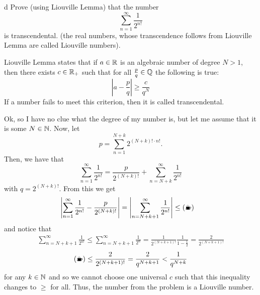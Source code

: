 \documentclass{article}
\begin{document}
\begin{problem}[7]{d}
Prove (using Liouville Lemma) that the number
$$\sum\limits_{n=1}^\infty \frac{1}{2^{n!}}$$
is transcendental. (the real numbers, whose transcendence follows from Liouville Lemma are called Liouville numbers).
\end{problem}

Liouville Lemma states that if $a\in\mathbb{R}$ is an algebraic number of degree $N>1$, then there exists $c\in\mathbb{R}_+$ such that for all $\frac{p}{q}\in\mathbb{Q}$ the following is true:
$$\left|a-\frac{p}{q}\right|\geq\frac{c}{q^N}$$
If a number fails to meet this criterion, then it is called transcendental.

Ok, so I have no clue what the degree of my number is, but let me assume that it is some $N\in\mathbb{N}$. Now, let
$$p=\sum\limits_{n=1}^{N+k}2^{(N+k)!\cdot n!}.$$
Then, we have that
$$\sum\limits_{n=1}^\infty\frac{1}{2^{n!}}=\frac{p}{2^{(N+k)!}}+\sum\limits_{n=N+k}^\infty \frac{1}{2^{n!}}$$
with $q=2^{(N+k)!}$. From this we get
\begin{align*}
    \left|\sum\limits_{n=1}^\infty\frac{1}{2^{n!}}-\frac{p}{2^{(N+k)!}}\right|&=\left|\sum\limits_{n=N+k+1}^\infty\frac{1}{2^{n!}}\right|\leq\text{(\Coffeecup)}
\end{align*}
and notice that
\begin{align*}
    \sum\limits_{n=N+k+1}^\infty\frac{1}{2^{n!}}\leq \sum\limits_{n=N+k+1}^\infty\frac{1}{2^n}=\frac{1}{2^{(N+k+1)!}}\frac{1}{1-\frac12}=\frac{2}{2^{(N+k+1)!}}
\end{align*}
\begin{align*}
    \text{(\Coffeecup)}\leq\frac{2}{2^{(N+k+1)!}}=\frac{2}{q^{N+k+1}}<\frac{1}{q^{N+k}}  
\end{align*}
for any $k\in\mathbb{N}$ and so we cannot choose one universal $c$ such that this inequality changes to $\geq$ for all. Thus, the number from the problem is a Liouville number.
\end{document}
